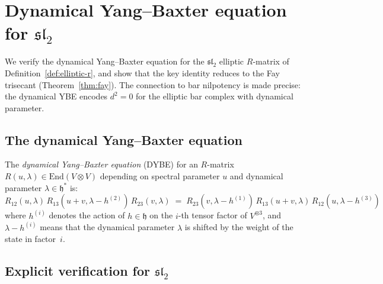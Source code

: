 \section{\texorpdfstring{Dynamical Yang--Baxter equation for $\mathfrak{sl}_2$}{Dynamical Yang--Baxter equation for sl2}}
\label{sec:dynamical-ybe-sl2}

We verify the dynamical Yang--Baxter equation for the
$\mathfrak{sl}_2$ elliptic $R$-matrix of
Definition~\ref{def:elliptic-r}, and show that the key identity
reduces to the Fay trisecant (Theorem~\ref{thm:fay}).  The
connection to bar nilpotency is made precise: the dynamical YBE
encodes $d^2 = 0$ for the elliptic bar complex with dynamical
parameter.

\subsection{The dynamical Yang--Baxter equation}
\label{subsec:dybe-statement}

\begin{definition}
\label{def:dybe}
The \emph{dynamical Yang--Baxter equation} (DYBE) for an
$R$-matrix $R(u, \lambda) \in \mathrm{End}(V \otimes V)$
depending on spectral parameter $u$ and dynamical parameter
$\lambda \in \mathfrak{h}^*$ is:
\begin{equation}\label{eq:dybe}
R_{12}(u, \lambda)\,
R_{13}(u+v, \lambda - h^{(2)})\,
R_{23}(v, \lambda)
\;=\;
R_{23}(v, \lambda - h^{(1)})\,
R_{13}(u+v, \lambda)\,
R_{12}(u, \lambda - h^{(3)})
\end{equation}
where $h^{(i)}$ denotes the action of $h \in \mathfrak{h}$ on
the $i$-th tensor factor of $V^{\otimes 3}$, and $\lambda - h^{(i)}$
means that the dynamical parameter $\lambda$ is shifted by the
weight of the state in factor~$i$.
\end{definition}

\subsection{\texorpdfstring{Explicit verification for $\mathfrak{sl}_2$}{Explicit verification for sl2}}
\label{subsec:dybe-sl2-verification}

